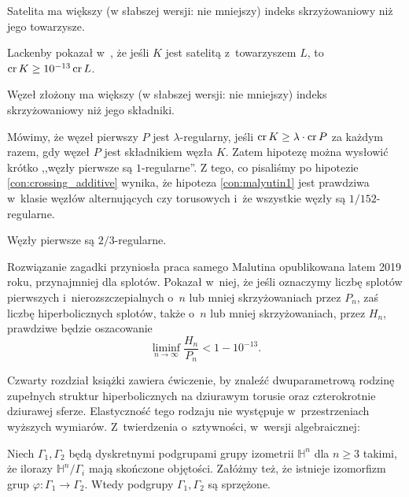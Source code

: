 \begin{conjecture}
    Satelita ma większy (w słabszej wersji: nie mniejszy) indeks skrzyżowaniowy niż jego towarzysze.
\end{conjecture}

Lackenby pokazał w~\cite{lackenby14}, że jeśli $K$ jest satelitą z~towarzyszem $L$, to $\operatorname{cr} K \ge 10^{-13} \operatorname{cr} L$.
%

\begin{conjecture}
    Węzeł złożony ma większy (w słabszej wersji: nie mniejszy) indeks skrzyżowaniowy niż jego składniki.
\end{conjecture}

Mówimy, że węzeł pierwszy $P$ jest $\lambda$-regularny, jeśli $\operatorname{cr} K \ge \lambda \cdot \operatorname{cr} P$ za każdym razem, gdy węzeł $P$ jest składnikiem węzła $K$.
Zatem hipotezę można wysłowić krótko ,,węzły pierwsze są $1$-regularne''.
Z tego, co pisaliśmy po hipotezie \ref{con:crossing_additive} wynika, że hipoteza \ref{con:malyutin1} jest prawdziwa w~klasie węzłów alternujących czy torusowych i~że wszystkie węzły są $1/152$-regularne.

\begin{conjecture}
    \label{con:malyutin4}
    Węzły pierwsze są $2/3$-regularne.
\end{conjecture}

Rozwiązanie zagadki przyniosła praca samego Malutina \cite{malyutin19} opublikowana latem 2019 roku, przynajmniej dla splotów.
%
Pokazał w~niej, że jeśli oznaczymy liczbę splotów pierwszych i~nierozszczepialnych o~$n$ lub mniej skrzyżowaniach przez $P_n$, zaś liczbę hiperbolicznych splotów, także o~$n$ lub mniej skrzyżowaniach, przez $H_n$, prawdziwe będzie oszacowanie
\begin{equation}
    \liminf_{n \to \infty} \frac{H_n}{P_n} < 1 - 10^{-13}.
\end{equation}

Czwarty rozdział książki \cite{purcell20} zawiera ćwiczenie, by znaleźć dwuparametrową rodzinę zupełnych struktur hiperbolicznych na dziurawym torusie oraz czterokrotnie dziurawej sferze.
Elastyczność tego rodzaju nie występuje w~przestrzeniach wyższych wymiarów.
Z~twierdzenia o~sztywności, w~wersji algebraicznej:

\begin{theorem}
    Niech $\Gamma_1, \Gamma_2$ będą dyskretnymi podgrupami grupy izometrii $\mathbb H^n$ dla $n \ge 3$ takimi, że ilorazy $\mathbb H^n/\Gamma_i$ mają skończone objętości.
    Załóżmy też, że istnieje izomorfizm grup $\varphi \colon \Gamma_1 \to \Gamma_2$.
    Wtedy podgrupy $\Gamma_1, \Gamma_2$ są sprzężone.
\end{theorem}

